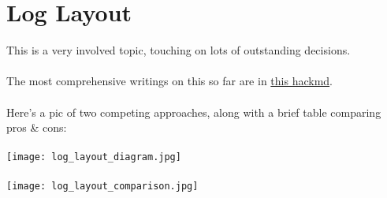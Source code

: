 \section{Log Layout}

This is a very involved topic, touching on lots of outstanding decisions.\\
\\
The most comprehensive writings on this so far are in \href{https://hackmd.io/@aztec-network/S1CL7uZIA?type=view#Tx-Log-Layouts}{this hackmd}.\\
\\
Here's a pic of two competing approaches, along with a brief table comparing pros \& cons:\\
\\
\texttt{[image: log\_layout\_diagram.jpg]}\\
\\
\texttt{[image: log\_layout\_comparison.jpg]}
